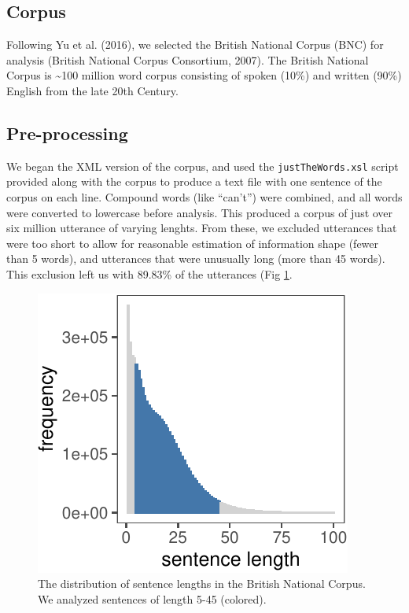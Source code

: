 \documentclass[10pt, letterpaper]{article}
\newenvironment{CodeChunk}{}{}
\begin{document}
\hypertarget{corpus}{%
\subsection{Corpus}\label{corpus}}

Following Yu et al. (2016), we selected the British National Corpus
(BNC) for analysis (British National Corpus Consortium, 2007). The
British National Corpus is \textasciitilde{}100 million word corpus
consisting of spoken (10\%) and written (90\%) English from the late
20th Century.

\hypertarget{pre-processing}{%
\subsection{Pre-processing}\label{pre-processing}}

We began the XML version of the corpus, and used the
\texttt{justTheWords.xsl} script provided along with the corpus to
produce a text file with one sentence of the corpus on each line.
Compound words (like ``can't'') were combined, and all words were
converted to lowercase before analysis. This produced a corpus of just
over six million utterance of varying lenghts. From these, we excluded
utterances that were too short to allow for reasonable estimation of
information shape (fewer than 5 words), and utterances that were
unusually long (more than 45 words). This exclusion left us with 89.83\%
of the utterances (Fig \ref{fig:bnc-lengths}.

\begin{CodeChunk}
\begin{figure}[tb]

{\centering \includegraphics{figs/bnc-lengths-1} 

}

\caption[The distribution of sentence lengths in the British National Corpus]{The distribution of sentence lengths in the British National Corpus. We analyzed sentences of length 5-45 (colored).}\label{fig:bnc-lengths}
\end{figure}
\end{CodeChunk}
\end{document}
